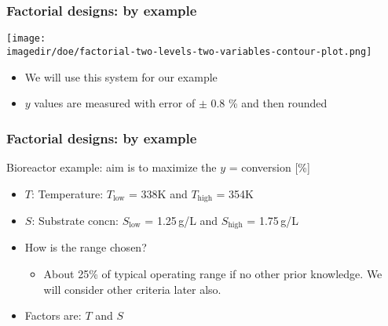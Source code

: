 \begin{frame}\frametitle{Factorial designs: by example}
	\begin{center}
		\texttt{[image: \\imagedir/doe/factorial-two-levels-two-variables-contour-plot.png]}
	\end{center}
	\begin{itemize}
		\item	We will use this system for our example
		\item	$y$ values are measured with error of $\pm$ 0.8 \% and then rounded
	\end{itemize}
\end{frame}

\begin{frame}\frametitle{Factorial designs: by example}

	Bioreactor example: aim is to maximize the $y$ = conversion [\%]
	\begin{itemize}
		\item	$T$: Temperature: $T_\text{low}$ = 338K and $T_\text{high}$ = 354K
		\item	$S$: Substrate concn: $S_\text{low}$ = 1.25\,g/L and $S_\text{high}$ = 1.75\,g/L
		\item	How is the range chosen?
		\begin{itemize}
			\item	About 25\% of typical operating range if no other prior knowledge. We will consider other criteria later also.
		\end{itemize}
	\end{itemize}
	\begin{itemize}
		\item	Factors are: $T$ and $S$
	\end{itemize}
	
	\vfill
	\vspace{4cm}
\end{frame}

